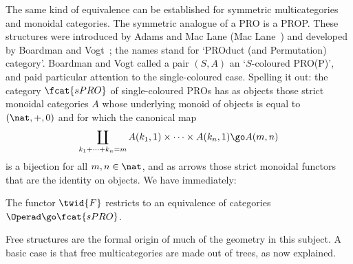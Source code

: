 The same kind of equivalence can be established for symmetric
multicategories and monoidal categories.  The symmetric analogue of a PRO
is a PROP.  These structures were introduced by Adams%
%
%
and Mac%
%
%
Lane (Mac
Lane~\cite{MacNAC}) and developed by Boardman%
%
%
and Vogt~\cite{BV};%
%
%
the names
stand for `PROduct (and Permutation) category'.  Boardman and Vogt called a
pair $(S,A)$ an `$S$-coloured PRO(P)', and paid particular attention to the
single-coloured case.  Spelling it out: the category $\fcat{sPRO}$ of
single-coloured PROs has as objects those strict monoidal categories $A$
whose underlying monoid of objects is equal to $(\nat,+,0)$ and for which
the canonical map
\[
\coprod_{k_1 + \cdots + k_n = m}
A(k_1, 1) \times\cdots\times A(k_n, 1)
\go 
A(m,n)
\]
is a bijection for all $m,n\in\nat$, and as arrows those strict monoidal
functors that are the identity on objects.  We have immediately:
%
\begin{cor}
The functor $\twid{F}$ restricts to an equivalence of categories %
$\Operad \go \fcat{sPRO}$.  
\done
\end{cor}%
%
%


%
%
%

Free structures are the formal origin of much of the geometry in this
subject.  A basic case is that free multicategories are made out of trees,
as now explained.

